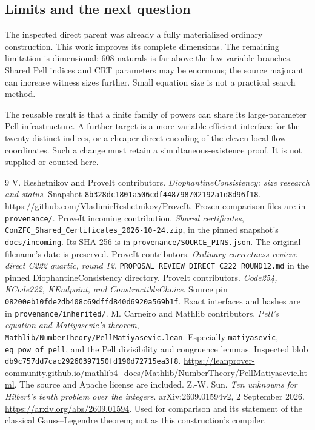 \documentclass[11pt,letterpaper]{article}
\theoremstyle{definition}\newtheorem{definition}[theorem]{Definition}
\theoremstyle{remark}\newtheorem{remark}[theorem]{Remark}
\begin{document}
\subsection{Limits and the next question}

The inspected direct parent was already a fully materialized ordinary
construction. This work improves its complete dimensions.
The remaining limitation is dimensional: 608 naturals is far above
the few-variable branches. Shared Pell indices and CRT parameters
may be enormous; the source majorant can increase witness sizes
further. Small equation size is not a practical search method.

The reusable result is that a finite family of powers can share
its large-parameter Pell infrastructure. A further target is a
more variable-efficient interface for the twenty distinct indices,
or a cheaper direct encoding of the eleven local flow coordinates.
Such a change must retain a simultaneous-existence proof. It is
not supplied or counted here.

\begingroup\small\raggedright
\begin{thebibliography}{9}
V. Reshetnikov and ProveIt contributors.
\emph{DiophantineConsistency: size research and status}.
Snapshot \texttt{8b328dc1801a506cdf448798702192a1d8d96f18}.
\url{https://github.com/VladimirReshetnikov/ProveIt}.
Frozen comparison files are in \texttt{provenance/}.
ProveIt incoming contribution.
\emph{Shared certificates},
\texttt{ConZFC\_Shared\_Certificates\_2026-10-24.zip},
in the pinned snapshot's \texttt{docs/incoming}.
Its SHA-256 is in \texttt{provenance/SOURCE\_PINS.json}.
The original filename's date is preserved.
ProveIt contributors.
\emph{Ordinary correctness review: direct C222 quartic, round 12}.
\texttt{PROPOSAL\_REVIEW\_DIRECT\_C222\_ROUND12.md}
in the pinned DiophantineConsistency directory.
ProveIt contributors.
\emph{Code254, KCode222, KEndpoint, and ConstructibleChoice}.
Source pin \texttt{08200eb10fde2db408c69dffd840d6920a569b1f}.
Exact interfaces and hashes are in \texttt{provenance/inherited/}.
M. Carneiro and Mathlib contributors.
\emph{Pell's equation and Matiyasevic's theorem},
\texttt{Mathlib/NumberTheory/PellMatiyasevic.lean}.
Especially \texttt{matiyasevic}, \texttt{eq\_pow\_of\_pell},
and the Pell divisibility and congruence lemmas.
Inspected blob \texttt{db9c757dd7cac29260397150fd190d72715ea3f8}.
\url{https://leanprover-community.github.io/mathlib4_docs/Mathlib/NumberTheory/PellMatiyasevic.html}.
The source and Apache license are included.
Z.-W. Sun.
\emph{Ten unknowns for Hilbert's tenth problem over the integers}.
arXiv:2609.01594v2, 2 September 2026.
\url{https://arxiv.org/abs/2609.01594}.
Used for comparison and its statement of the classical Gauss--Legendre
theorem; not as this construction's compiler.
\end{thebibliography}
\endgroup
\end{document}
